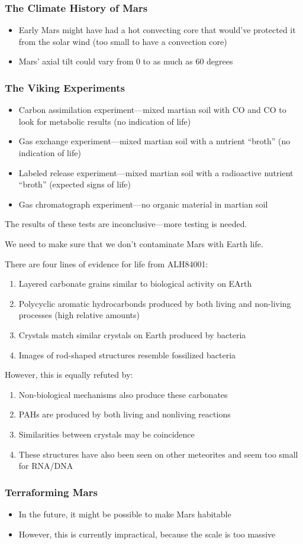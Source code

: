 \documentclass[class=article, crop=false]{standalone}
\begin{document}
  \subsubsection{The Climate History of Mars}
  \begin{itemize}
    \item Early Mars might have had a hot convecting core that would've protected it from the solar wind (too small to have a convection core)
    \item Mars' axial tilt could vary from $0$ to as much as $60$ degrees
  \end{itemize}
  \subsubsection{The Viking Experiments}
  \begin{itemize}
    \item Carbon assimilation experiment---mixed martian soil with CO and CO to look for metabolic results (no indication of life)
    \item Gas exchange experiment---mixed martian soil with a nutrient ``broth'' (no indication of life)
    \item Labeled release experiment---mixed martian soil with a radioactive nutrient ``broth'' (expected signs of life)
    \item Gas chromatograph experiment---no organic material in martian soil
  \end{itemize}
  The results of these tests are inconclusive---more testing is needed.
  \begin{note}{}
    We need to make sure that we don't contaminate Mars with Earth life.
  \end{note}
  There are four lines of evidence for life from ALH84001:
  \begin{enumerate}
    \item Layered carbonate grains similar to biological activity on EArth
    \item Polycyclic aromatic hydrocarbonds produced by both living and non-living processes (high relative amounts)
    \item Crystals match similar crystals on Earth produced by bacteria
    \item Images of rod-shaped structures resemble fossilized bacteria
  \end{enumerate}
  However, this is equally refuted by:
  \begin{enumerate}
    \item Non-biological mechanisms also produce these carbonates
    \item PAHs are produced by both living and nonliving reactions
    \item Similarities between crystals may be coincidence
    \item These structures have also been seen on other meteorites and seem too small for RNA/DNA
  \end{enumerate}
  \subsubsection{Terraforming Mars}
  \begin{itemize}
    \item In the future, it might be possible to make Mars habitable
    \item However, this is currently impractical, because the scale is too massive
  \end{itemize}
\end{document}
